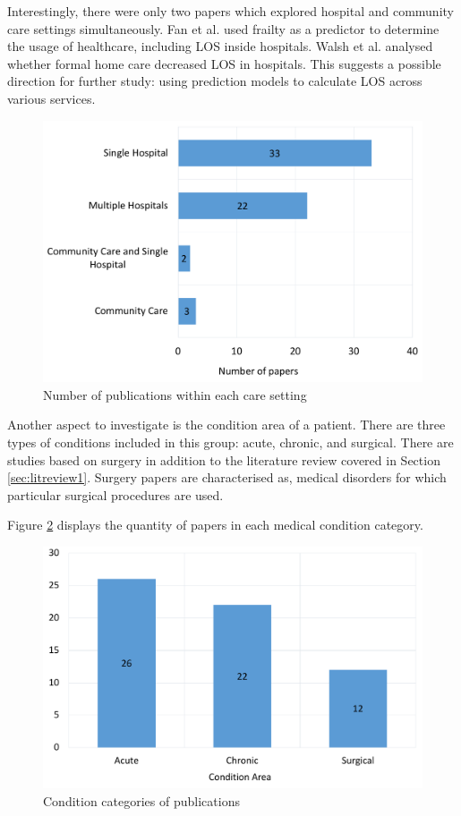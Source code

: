 \documentclass[../thesis.tex]{subfiles}
\begin{document}
Interestingly, there were only two papers which explored hospital and community care settings simultaneously. Fan et al. \cite{Fan2021} used frailty as a predictor to determine the usage of healthcare, including LOS inside hospitals. Walsh et al. \cite{Walsh2020} analysed whether formal home care decreased LOS in hospitals. This suggests a possible direction for further study: using prediction models to calculate LOS across various services.

\begin{figure}[h!]
    \centering
    \includegraphics[scale=0.5]{Chapters/Chapter2/Figures2/care1.pdf}
    \caption{Number of publications within each care setting}
    \label{fig:litreview2-care}
\end{figure}

Another aspect to investigate is the condition area of a patient. There are three types of conditions included in this group: acute, chronic, and surgical. There are studies based on surgery in addition to the literature review covered in Section \ref{sec:litreview1}. Surgery papers are characterised as, medical disorders for which particular surgical procedures are used.

Figure \ref{fig:litreview2-condition} displays the quantity of papers in each medical condition category.

\begin{figure}[h!]
    \centering
    \includegraphics[scale=0.5]{Chapters/Chapter2/Figures2/area1.pdf}
    \caption{Condition categories of publications}
    \label{fig:litreview2-condition}
\end{figure}
\end{document}
